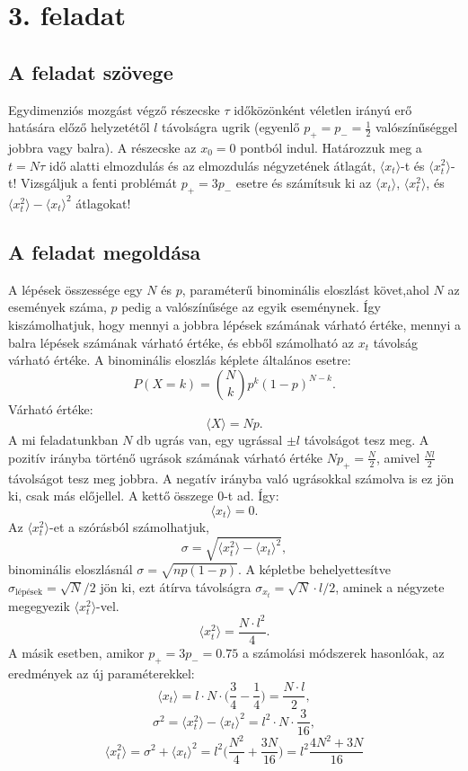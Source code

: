 \documentclass[12pt]{article}
\begin{document}
\section*{3. feladat}
\subsection*{A feladat szövege}
Egydimenziós mozgást végző részecske $\tau$ időközönként véletlen irányú erő hatására előző helyzetétől $l$ távolságra ugrik (egyenlő $p_{+} = p_{-} =\frac{1}{2} $ valószínűséggel jobbra vagy balra). A részecske az $x_0 = 0$ pontból indul.
Határozzuk meg a $ t = N \tau$ idő alatti elmozdulás és az elmozdulás négyzetének átlagát, $\langle x_t\rangle$-t és $\langle x^2_t \rangle$-t!
Vizsgáljuk a fenti problémát $p_+ = 3p_-$ esetre és számítsuk ki az $\langle x_t \rangle $, $\langle x^2_t\rangle$, és $\langle x^2_t\rangle-\langle x_t \rangle ^2$ átlagokat!
\subsection*{A feladat megoldása}
A lépések összessége egy $N$ és $p$, paraméterű binominális eloszlást követ,ahol $N$ az események száma, $p$ pedig a valószínűsége az egyik eseménynek. Így kiszámolhatjuk, hogy mennyi a jobbra lépések számának várható értéke, mennyi a balra lépések számának várható értéke, és ebből számolható az $x_t$ távolság várható értéke. A binominális eloszlás képlete általános esetre:
$$P(X = k) = {{N}\choose{k}}p^k(1-p)^{N-k}.$$
Várható értéke:
$$ \langle X \rangle = Np .$$
A mi feladatunkban $N$ db ugrás van, egy ugrással $\pm l$ távolságot tesz meg. A pozitív irányba történő ugrások számának várható értéke $Np_+ = \frac{N}{2}$, amivel $\frac{Nl}{2}$ távolságot tesz meg jobbra. A negatív irányba való ugrásokkal számolva is ez jön ki, csak más előjellel. A kettő összege $0$-t ad. Így:
$$\langle x_t \rangle = 0. $$
Az $\langle x^2_t \rangle $-et a szórásból számolhatjuk,
$$ \sigma = \sqrt{\langle x^2_t \rangle-\langle x_t \rangle ^2},$$ binominális eloszlásnál $\sigma = \sqrt{np(1-p)}$. A képletbe behelyettesítve $\sigma_{\text{lépések}} = \sqrt{N}/2$ jön ki, ezt átírva távolságra $\sigma_{x_t} = \sqrt{N}\cdot l /2$, aminek a négyzete megegyezik $\langle x^2_t \rangle $-vel.
$$\langle x^2_t \rangle = \frac{N\cdot l^2}{4}.$$
A másik esetben, amikor $p_+=3p_-=0.75$ a számolási módszerek hasonlóak, az eredmények az új paraméterekkel:
$$\langle x_t \rangle = l\cdot N\cdot \Big(\frac{3}{4}-\frac{1}{4}\Big ) = \frac{N\cdot l}{2},$$
$$\sigma^2 = {\langle x^2_t \rangle-\langle x_t \rangle ^2} = l^2\cdot N\cdot \frac{3}{16},$$
$$\langle x^2_t \rangle = \sigma^2 + \langle x_t \rangle ^2  = l^2\Big ( \frac{N^2}{4} + \frac{3N}{16} \Big ) = l^2\frac{4N^2 + 3N}{16}$$
\newpage
\end{document}
